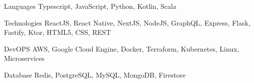 

\begin{cvskills}

  \cvskill
    {Languages}
    {Typescript, JavaScript, Python, Kotlin, Scala}  

  \cvskill
    {Technologies}
    {ReactJS, React Native, NextJS, NodeJS, GraphQL, Express, Flask, Fastify, Ktor, HTML5, CSS, REST}   

  \cvskill
    {DevOPS}
    {AWS, Google Cloud Engine, Docker, Terraform, Kubernetes, Linux, Microservices}       

  \cvskill
    {Database}
    {Redis, PostgreSQL, MySQL, MongoDB, Firestore}

\end{cvskills}